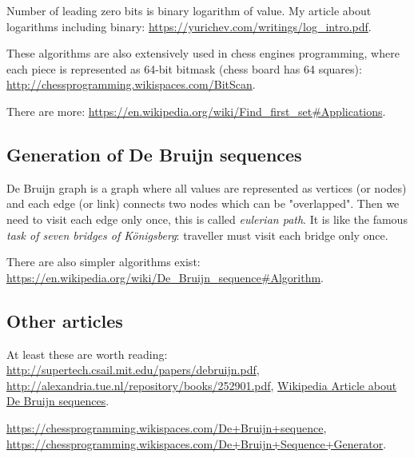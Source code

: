Number of leading zero bits is binary logarithm of value. My article about logarithms including binary:
\url{https://yurichev.com/writings/log_intro.pdf}.

These algorithms are also extensively used in chess engines programming, where each piece is represented as 64-bit bitmask (chess board has 64 squares):
\url{http://chessprogramming.wikispaces.com/BitScan}.

There are more: \url{https://en.wikipedia.org/wiki/Find_first_set\#Applications}.

\subsection{Generation of De Bruijn sequences}

De Bruijn graph is a graph where all values are represented as vertices (or nodes) and each edge (or link) connects two nodes which can be "overlapped".
Then we need to visit each edge only once, this is called \textit{eulerian path}.
It is like the famous \textit{task of seven bridges of Königsberg}:
traveller must visit each bridge only once.

There are also simpler algorithms exist: \url{https://en.wikipedia.org/wiki/De_Bruijn_sequence\#Algorithm}.

\subsection{Other articles}

At least these are worth reading:
\url{http://supertech.csail.mit.edu/papers/debruijn.pdf},
\url{http://alexandria.tue.nl/repository/books/252901.pdf},
\href{https://en.wikipedia.org/wiki/De_Bruijn_sequence}{Wikipedia Article about De Bruijn sequences}.

\url{https://chessprogramming.wikispaces.com/De+Bruijn+sequence},
\url{https://chessprogramming.wikispaces.com/De+Bruijn+Sequence+Generator}.


